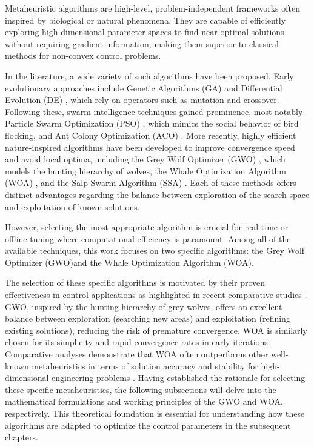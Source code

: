 Metaheuristic algorithms are high-level, problem-independent frameworks often inspired by biological or natural phenomena. They are capable of efficiently exploring high-dimensional parameter spaces to find near-optimal solutions without requiring gradient information, making them superior to classical methods for non-convex control problems.

In the literature, a wide variety of such algorithms have been proposed. Early evolutionary approaches include Genetic Algorithms (GA)  \cite{GA_Ref} and Differential Evolution (DE)  \cite{DE_Ref}, which rely on operators such as mutation and crossover. Following these, swarm intelligence techniques gained prominence, most notably Particle Swarm Optimization (PSO)  \cite{PSO_Ref, glida2020pso}, which mimics the social behavior of bird flocking, and Ant Colony Optimization (ACO)  \cite{ACO_Ref}. More recently, highly efficient nature-inspired algorithms have been developed to improve convergence speed and avoid local optima, including the Grey Wolf Optimizer (GWO)  \cite{gwo}, which models the hunting hierarchy of wolves, the Whale Optimization Algorithm (WOA)  \cite{woa}, and the Salp Swarm Algorithm (SSA)  \cite{SSA_Ref}. Each of these methods offers distinct advantages regarding the balance between exploration of the search space and exploitation of known solutions.

However, selecting the most appropriate algorithm is crucial for real-time or offline tuning where computational efficiency is paramount. Among all of the available techniques, this work focuses on two specific algorithms: the Grey Wolf Optimizer (GWO)and the Whale Optimization Algorithm (WOA). 

The selection of these specific algorithms is motivated by their proven effectiveness in control applications as highlighted in recent comparative studies  \cite{9064786,gwo}. GWO, inspired by the hunting hierarchy of grey wolves, offers an excellent balance between exploration (searching new areas) and exploitation (refining existing solutions), reducing the risk of premature convergence. WOA is similarly chosen for its simplicity and rapid convergence rates in early iterations. Comparative analyses demonstrate that WOA often outperforms other well-known metaheuristics in terms of solution accuracy and stability for high-dimensional engineering problems  \cite{gwo}.
Having established the rationale for selecting these specific metaheuristics, the following subsections will delve into the mathematical formulations and working principles of the GWO and WOA, respectively. This theoretical foundation is essential for understanding how these algorithms are adapted to optimize the control parameters in the subsequent chapters.

